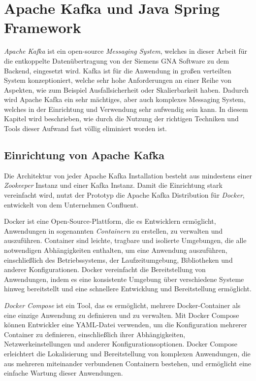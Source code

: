 \section{Apache Kafka und Java Spring Framework}
\label{apacheKafkaImpl}

\emph{Apache Kafka} ist ein open-source \emph{Messaging System}, welches in dieser Arbeit für die entkoppelte Datenübertragung von der Siemens GNA Software zu dem Backend, eingesetzt wird. Kafka ist für die Anwendung in großen verteilten System konzeptioniert, welche sehr hohe Anforderungen an einer Reihe von Aspekten, wie zum Beispiel Ausfallsicherheit oder Skalierbarkeit haben. Dadurch wird Apache Kafka ein sehr mächtiges, aber auch komplexes Messaging System, welches in der Einrichtung und Verwendung sehr aufwendig sein kann. In diesem Kapitel wird beschrieben, wie durch die Nutzung der richtigen Techniken und Tools dieser Aufwand fast völlig eliminiert worden ist.

\subsection{Einrichtung von Apache Kafka}

Die Architektur von jeder Apache Kafka Installation besteht aus mindestens einer \emph{Zookeeper} Instanz und einer Kafka Instanz. Damit die Einrichtung stark vereinfacht wird, nutzt der Prototyp die Apache Kafka Distribution für \emph{Docker}, entwickelt von dem Unternehmen Confluent. 

Docker ist eine Open-Source-Plattform, die es Entwicklern ermöglicht, Anwendungen in sogenannten \emph{Containern} zu erstellen, zu verwalten und auszuführen. Container sind leichte, tragbare und isolierte Umgebungen, die alle notwendigen Abhängigkeiten enthalten, um eine Anwendung auszuführen, einschließlich des Betriebssystems, der Laufzeitumgebung, Bibliotheken und anderer Konfigurationen. Docker vereinfacht die Bereitstellung von Anwendungen, indem es eine konsistente Umgebung über verschiedene Systeme hinweg bereitstellt und eine schnellere Entwicklung und Bereitstellung ermöglicht. \cite{turnbull2014docker}

\emph{Docker Compose} ist ein Tool, das es ermöglicht, mehrere Docker-Container als eine einzige Anwendung zu definieren und zu verwalten. Mit Docker Compose können Entwickler eine YAML-Datei verwenden, um die Konfiguration mehrerer Container zu definieren, einschließlich ihrer Abhängigkeiten, Netzwerkeinstellungen und anderer Konfigurationsoptionen. Docker Compose erleichtert die Lokalisierung und Bereitstellung von komplexen Anwendungen, die aus mehreren miteinander verbundenen Containern bestehen, und ermöglicht eine einfache Wartung dieser Anwendungen.
\cite{turnbull2014docker}

